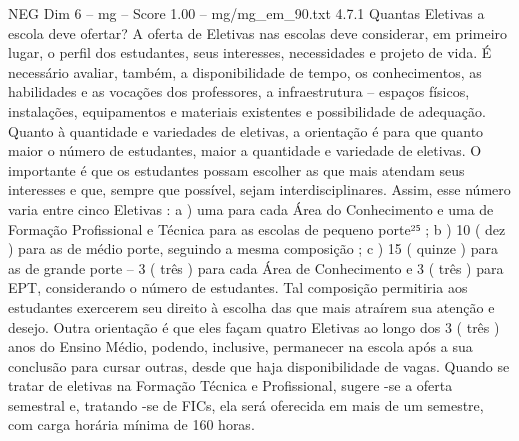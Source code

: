 \begin{textsample}{NEG Dim 6 – mg – Score 1.00 – mg/mg\_em\_90.txt}  \label{ex:f6_neg_044}
4.7.1 Quantas Eletivas a escola deve ofertar?
A oferta de Eletivas nas escolas deve considerar, em primeiro lugar, o perfil dos estudantes, seus interesses, necessidades e projeto de vida.
É necessário avaliar, também, a disponibilidade de tempo, os conhecimentos, as habilidades e as vocações dos professores, a infraestrutura – espaços físicos, instalações, equipamentos e materiais existentes e possibilidade de adequação.
Quanto à quantidade e variedades de eletivas, a orientação é para que quanto maior o número de estudantes, maior a quantidade e variedade de eletivas.
O importante é que os estudantes possam escolher as que mais atendam seus interesses e que, sempre que possível, sejam interdisciplinares.
Assim, esse número varia entre cinco Eletivas : a ) uma para cada Área do Conhecimento e uma de Formação Profissional e Técnica para as escolas de pequeno porte²⁵ ; b ) 10 ( dez ) para as de médio porte, seguindo a mesma composição ; c ) 15 ( quinze ) para as de grande porte – 3 ( três ) para cada Área de Conhecimento e 3 ( três ) para EPT, considerando o número de estudantes.
Tal composição permitiria aos estudantes exercerem seu direito à escolha das que mais atraírem sua atenção e desejo.
Outra orientação é que eles façam quatro Eletivas ao longo dos 3 ( três ) anos do Ensino Médio, podendo, inclusive, permanecer na escola após a sua conclusão para cursar outras, desde que haja disponibilidade de vagas.
Quando se tratar de eletivas na Formação Técnica e Profissional, sugere -se a oferta semestral e, tratando -se de FICs, ela será oferecida em mais de um semestre, com carga horária mínima de 160 horas.

\end{textsample}
